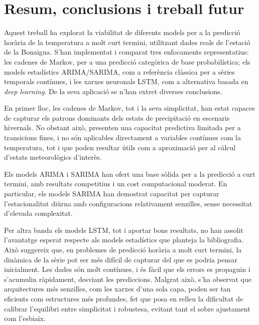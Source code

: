 \documentclass[../main.tex]{subfiles}
\begin{document}

\chapter{Resum, conclusions i treball futur} \label{ch:conclusions}

Aquest treball ha explorat la viabilitat de diferents models per a la predicció horària de la temperatura a molt curt termini, utilitzant dades reals de l’estació de la Bonaigua. S’han implementat i comparat tres enfocaments representatius: les cadenes de Markov, per a una predicció categòrica de base probabilística; els models estadístics ARIMA/SARIMA, com a referència clàssica per a sèries temporals contínues, i les xarxes neuronals LSTM, com a alternativa basada en \textit{deep learning}. De la seva aplicació se n’han extret diverses conclusions.

En primer lloc, les cadenes de Markov, tot i la seva simplicitat, han estat capaces de capturar els patrons dominants dels estats de precipitació en escenaris hivernals. No obstant això, presenten una capacitat predictiva limitada per a transicions fines, i no són aplicables directament a variables contínues com la temperatura, tot i que poden resultar útils com a aproximació per al càlcul d’estats meteorològics d’interès.

Els models ARIMA i SARIMA han ofert una base sòlida per a la predicció a curt termini, amb resultats competitius i un cost computacional moderat. En particular, els models SARIMA han demostrat capacitat per capturar l’estacionalitat diürna amb configuracions relativament senzilles, sense necessitat d’elevada complexitat.

Per altra banda els models LSTM, tot i aportar bons resultats, no han assolit l’avantatge esperat respecte als models estadístics que planteja la bibliografia. Això suggereix que, en problemes de predicció horària a molt curt termini, la dinàmica de la sèrie pot ser més difícil de capturar del que es podria pensar inicialment. Les dades són molt contínues, i és fàcil que els errors es propaguin i s’acumulin ràpidament, desviant les prediccions. Malgrat això, s’ha observat que arquitectures més senzilles, com les xarxes d’una sola capa, poden ser tan eficients com estructures més profundes, fet que posa en relleu la dificultat de calibrar l’equilibri entre simplicitat i robustesa, evitant tant el sobre ajustament com l’esbiaix.
\end{document}
